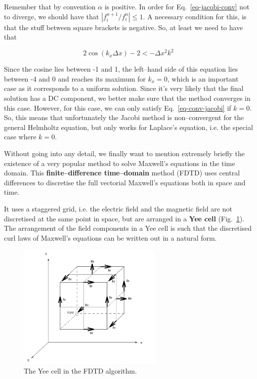 Remember that by convention $\alpha$ is positive. In order for Eq.~\ref{eq-jacobi-conv} not to diverge, we should have that $\left|f_i^{n+1} / f_i^{n}\right| \le 1$. A necessary condition for this, is that the stuff between square brackets is negative. So, at least we need to have that

\begin{equation}
2 \cos ( k_x  \Delta x) - 2 \lt - \Delta x^2 k^2 \label{eq-conv-jacobi}
\end{equation} 

Since the cosine lies between -1 and 1, the left--hand side of this equation lies between -4 and 0 and reaches its maximum for $k_x=0$, which is an important case as it corresponds to a uniform solution. Since it's very likely that the final solution has a DC component, we better make sure that the method converges in this case. However, for this case, we can only satisfy Eq.~\ref{eq-conv-jacobi} if $k=0$. So, this means that unfortunately the Jacobi method is non--convergent for the general Helmholtz equation, but only works for Laplace's equation, i.e. the special case where $k=0$.

\pagebreak

\label{week6}

Without going into any detail, we finally want to mention extremely briefly the existence of a very popular method to solve Maxwell's equations in the time domain. This \textbf{finite--difference time--domain} method (FDTD) uses central differences to discretise the full vectorial Maxwell's equations both in space and time.

It uses a staggered grid, i.e. the electric field and the magnetic field are not discretised at the same point in space, but are arranged in a \textbf{Yee cell} (Fig.~\ref{fig-yee}). The arrangement of the field components in a Yee cell is such that the discretised curl laws of Maxwell's equations can be written out in a natural form.

\begin{figure}
\centering
\includegraphics[width=7cm]{numeric/figures/yeecell}
\caption{The Yee cell in the FDTD algorithm.}
\label{fig-yee}
\end{figure}

